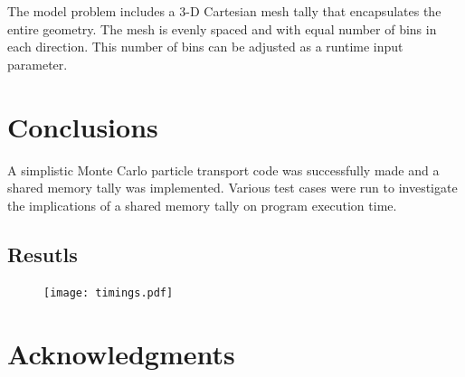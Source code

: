 \documentclass{mc2015}
\begin{document}
The model problem includes a 3-D Cartesian mesh tally
that encapsulates the entire geometry.
The mesh is evenly spaced and with equal number of bins in each direction.
This number of bins can be adjusted as a runtime input parameter.

\section{Conclusions}

A simplistic Monte Carlo particle transport code was successfully made
and a shared memory tally was implemented.
Various test cases were run to investigate the implications
of a shared memory tally on program execution time.

\subsection{Resutls}

\begin{figure}[h]
	\centering
	\texttt{[image: timings.pdf]}
\end{figure}

\section{Acknowledgments}



\setlength{\baselineskip}{12pt}




\end{document}
